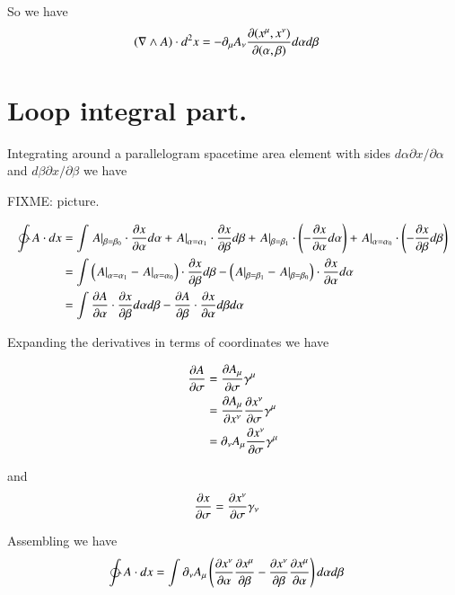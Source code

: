 So we have
\begin{align}\label{eqn:withJac}
( \grad \wedge A ) \cdot d^2 x &= -\partial_\mu A_\nu \frac{\partial (x^\mu, x^\nu)}{\partial (\alpha, \beta)} d\alpha d\beta
\end{align}

\section{Loop integral part.}

Integrating around a parallelogram spacetime area element with sides $d\alpha \partial x/\partial \alpha$ and $d\beta \partial x/\partial \beta$ we have

FIXME: picture.

\begin{align*}
\ointctrclockwise 
A \cdot dx
&=
\int
{\left. A \right\vert}_{\beta=\beta_0} \cdot \PD{\alpha}{x} d\alpha
+ {\left. A \right\vert}_{\alpha=\alpha_1} \cdot \PD{\beta}{x} d\beta
+ {\left. A \right\vert}_{\beta=\beta_1} \cdot \left( -\PD{\alpha}{x} d\alpha \right)
+ {\left. A \right\vert}_{\alpha=\alpha_0} \cdot \left( -\PD{\beta}{x} d\beta \right) 
\\
&=
\int
\left( {\left. A \right\vert}_{\alpha=\alpha_1} - {\left. A \right\vert}_{\alpha=\alpha_0} \right) \cdot \PD{\beta}{x} d\beta
-\left( {\left. A \right\vert}_{\beta=\beta_1} - {\left. A \right\vert}_{\beta=\beta_0} \right) \cdot \PD{\alpha}{x} d\alpha 
\\
&=
\int
\PD{\alpha}{A} \cdot \PD{\beta}{x} d\alpha d\beta
-\PD{\beta}{A} \cdot \PD{\alpha}{x} d\beta d\alpha
\end{align*}

Expanding the derivatives in terms of coordinates we have

\begin{align*}
\PD{\sigma}{A} 
&=
\PD{\sigma}{A_\mu} \gamma^\mu \\
&= 
\PD{x^\nu}{A_\mu}\PD{\sigma}{x^\nu} \gamma^\mu \\
&= 
\partial_\nu A_\mu \PD{\sigma}{x^\nu} \gamma^\mu \\
\end{align*}

and
\begin{align*}
\PD{\sigma}{x} &= \PD{\sigma}{x^\nu} \gamma_\nu
\end{align*}

Assembling we have
\begin{align*}
\ointctrclockwise 
A \cdot dx
&=
\int
\partial_\nu A_\mu \left( \PD{\alpha}{x^\nu} \PD{\beta}{x^\mu} - \PD{\beta}{x^\nu} \PD{\alpha}{x^\mu} \right) d\alpha d\beta
\end{align*}

